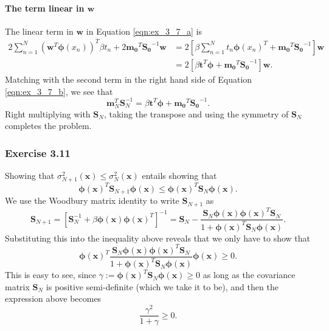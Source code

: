 \documentclass[12pt, a4paper]{article}
\newcommand{\vect}[1]{\bm{#1}}
\begin{document}
\paragraph{The term linear in $\vect{w}$}
The linear term in $\vect{w}$ in Equation \eqref{eqn:ex_3_7_a} is
\begin{align*}
		2 \sum_{n=1}^{N} (\vect{w}^T \vect{\phi}(x_n))^T \beta t_n
		+
		2 \vect{m_0}^T \vect{S_0}^{-1} \vect{w}
		&=
		2 \left[ 
		\beta \sum_{n=1}^{N}  t_n \vect{\phi}(x_n)^T + \vect{m_0}^T \vect{S_0}^{-1}
		 \right] \vect{w} \\
		&=
		2 \left[ 
		\beta \vect{t}^T \vect{\phi} + \vect{m_0}^T \vect{S_0}^{-1}
		\right] \vect{w}.
\end{align*}
Matching with the second term in the right hand side of Equation \eqref{eqn:ex_3_7_b}, we see that
\begin{equation*}
	\vect{m}_N^T \vect{S}_N^{-1} = \beta \vect{t}^T \vect{\phi} + \vect{m_0}^T \vect{S_0}^{-1}.
\end{equation*}
Right multiplying with $\vect{S}_N$, taking the transpose and using the symmetry of $\vect{S}_N$ completes the problem.


\subsubsection*{Exercise 3.11}
Showing that $\sigma^2_{N+1} (\vect{x}) \leq \sigma^2_{N} (\vect{x})$ entails showing that
\begin{equation*}
	\vect{\phi}( \vect{x} )^T \vect{S}_{N + 1} \vect{\phi}( \vect{x} )
	\leq 
	\vect{\phi}( \vect{x} )^T \vect{S}_{N } \vect{\phi}( \vect{x} ).
\end{equation*}
We use the Woodbury matrix identity to write $\vect{S}_{N + 1}$ as
\begin{equation*}
	\vect{S}_{N + 1}
	=
	\left[ \vect{S}_{N}^{-1} + \beta \vect{\phi}(\vect{x}) \vect{\phi}( \vect{x} )^T   \right]^{-1}
	=
	\vect{S}_N
	-
	\frac{
		\vect{S}_N\vect{\phi}(\vect{x}) \vect{\phi}(\vect{x})^T   \vect{S}_N
		}{
		1 + \vect{\phi}(\vect{x})^T \vect{S}_N \vect{\phi}(\vect{x})
		}.
\end{equation*}
Substituting this into the inequality above reveals that we only have to show that
\begin{equation*}
	\vect{\phi}( \vect{x} )^T
		\frac{
			\vect{S}_N\vect{\phi}(\vect{x}) \vect{\phi}(\vect{x})^T   \vect{S}_N
		}{
		1 + \vect{\phi}(\vect{x})^T \vect{S}_N \vect{\phi}(\vect{x})
	}
	 \vect{\phi}( \vect{x} ) \geq 0 .
\end{equation*}
This is easy to see, since $\gamma := \vect{\phi}(\vect{x})^T \vect{S}_N \vect{\phi}(\vect{x}) \geq 0$ as long as the covariance matrix $\vect{S}_N$ is positive semi-definite (which we take it to be), and then the expression above becomes
\begin{equation*}
	\frac{\gamma^2}{1 + \gamma} \geq 0.
\end{equation*}
\end{document}
